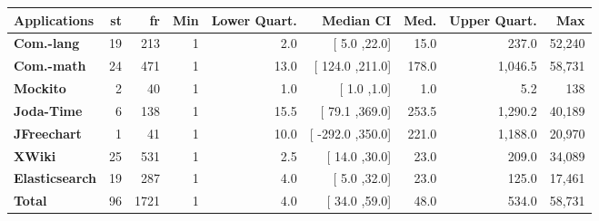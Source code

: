 \begin{tabularx}{0.945\textwidth}{ l r r r r r r r r } 
\hline 
\textbf{Applications} & \textbf{st} & \textbf{fr}& \textbf{Min} & \textbf{Lower Quart.} & \textbf{Median CI} & \textbf{Med.} & \textbf{Upper Quart.} & \textbf{Max} \\ 
\hline 
\textbf{ Com.-lang } & 19  & 213  & 1  & 2.0  & [ 5.0 ,22.0] & 15.0  & 237.0  & 52,240  \\ 
\textbf{ Com.-math } & 24  & 471  & 1  & 13.0  & [ 124.0 ,211.0] & 178.0  & 1,046.5  & 58,731  \\ 
\textbf{ Mockito } & 2  & 40  & 1  & 1.0  & [ 1.0 ,1.0] & 1.0  & 5.2  & 138  \\ 
\textbf{ Joda-Time } & 6  & 138  & 1  & 15.5  & [ 79.1 ,369.0] & 253.5  & 1,290.2  & 40,189  \\ 
\textbf{ JFreechart } & 1  & 41  & 1  & 10.0  & [ -292.0 ,350.0] & 221.0  & 1,188.0  & 20,970  \\ 
\textbf{ XWiki } & 25  & 531  & 1  & 2.5  & [ 14.0 ,30.0] & 23.0  & 209.0  & 34,089  \\ 
\textbf{ Elasticsearch } & 19  & 287  & 1  & 4.0  & [ 5.0 ,32.0] & 23.0  & 125.0  & 17,461  \\ 
\hline 
\textbf{Total} & 96  & 1721  & 1  & 4.0  & [ 34.0 ,59.0] & 48.0  & 534.0  & 58,731  \\ 
\hline 
\end{tabularx} 
